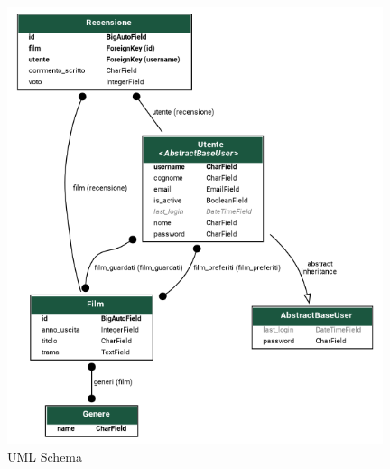 \documentclass[12pt]{article}
\begin{document}
	
	\begin{center}
		\centering \includegraphics[width=11cm]{Immagini/streamify.png} \\
		\centering UML Schema
	\end{center}
		\pagebreak
		
\end{document}
